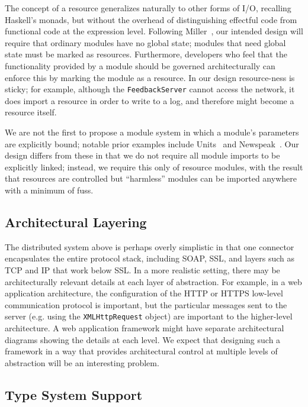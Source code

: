 \documentclass[runningheads]{llncs}
\begin{document}
\begin{sloppypar}
The concept of a resource generalizes naturally to other forms of I/O, recalling Haskell's monads, but without the overhead of distinguishing effectful code from functional code at the expression level.  Following Miller~\cite{MarkMiller-E}, our intended design will require that ordinary modules have no global state; modules that need global state must be marked as resources.  Furthermore, developers who feel that the functionality provided by a module should be governed architecturally can enforce this by marking the module as a resource.  In our design resource-ness is sticky; for example, although the \texttt{FeedbackServer} cannot access the network, it does import a resource in order to write to a log, and therefore might become a resource itself.

We are not the first to propose a module system in which a module's parameters are explicitly bound; notable prior examples include Units~\cite{FF98} and Newspeak~\cite{BrachaNewspeakModules}.  Our design differs from these in that we do not require all module imports to be explicitly linked; instead, we require this only of resource modules, with the result that resources are controlled but ``harmless'' modules can be imported anywhere with a minimum of fuss.

\subsection{Architectural Layering}

The distributed system above is perhaps overly simplistic in that one connector encapsulates the entire protocol stack, including SOAP, SSL, and layers such as TCP and IP that work below SSL.  In a more realistic setting, there may be architecturally relevant details at each layer of abstraction.  For example, in a web application architecture, the configuration of the HTTP or HTTPS low-level communication protocol is important, but the particular messages sent to the server (e.g. using the \texttt{XMLHttpRequest} object) are important to the higher-level architecture.  A web application framework might have separate architectural diagrams showing the details at each level.  We expect that designing such a framework in a way that provides architectural control at multiple levels of abstraction will be an interesting problem.


\subsection{Type System Support}


\end{sloppypar}
\end{document}
